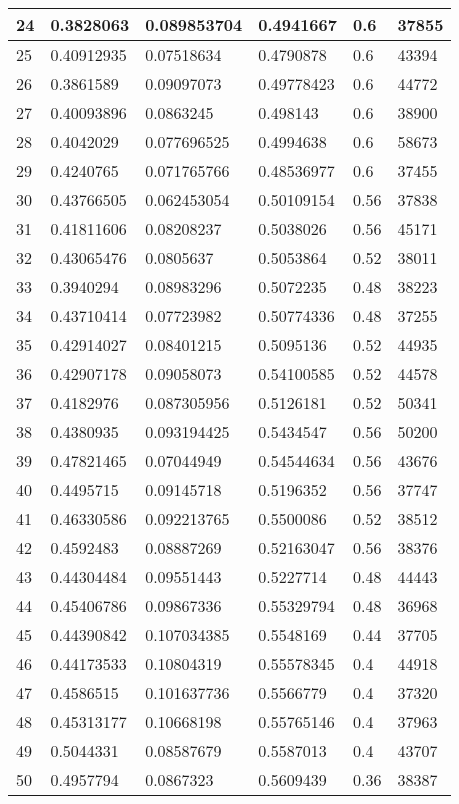\begin{longtable}{|l|l|l|l|l|l|}
24 & 0.3828063 & 0.089853704 & 0.4941667 & 0.6 & 37855 \\ \hline 
25 & 0.40912935 & 0.07518634 & 0.4790878 & 0.6 & 43394 \\ \hline 
26 & 0.3861589 & 0.09097073 & 0.49778423 & 0.6 & 44772 \\ \hline 
27 & 0.40093896 & 0.0863245 & 0.498143 & 0.6 & 38900 \\ \hline 
28 & 0.4042029 & 0.077696525 & 0.4994638 & 0.6 & 58673 \\ \hline 
29 & 0.4240765 & 0.071765766 & 0.48536977 & 0.6 & 37455 \\ \hline 
30 & 0.43766505 & 0.062453054 & 0.50109154 & 0.56 & 37838 \\ \hline 
31 & 0.41811606 & 0.08208237 & 0.5038026 & 0.56 & 45171 \\ \hline 
32 & 0.43065476 & 0.0805637 & 0.5053864 & 0.52 & 38011 \\ \hline 
33 & 0.3940294 & 0.08983296 & 0.5072235 & 0.48 & 38223 \\ \hline 
34 & 0.43710414 & 0.07723982 & 0.50774336 & 0.48 & 37255 \\ \hline 
35 & 0.42914027 & 0.08401215 & 0.5095136 & 0.52 & 44935 \\ \hline 
36 & 0.42907178 & 0.09058073 & 0.54100585 & 0.52 & 44578 \\ \hline 
37 & 0.4182976 & 0.087305956 & 0.5126181 & 0.52 & 50341 \\ \hline 
38 & 0.4380935 & 0.093194425 & 0.5434547 & 0.56 & 50200 \\ \hline 
39 & 0.47821465 & 0.07044949 & 0.54544634 & 0.56 & 43676 \\ \hline 
40 & 0.4495715 & 0.09145718 & 0.5196352 & 0.56 & 37747 \\ \hline 
41 & 0.46330586 & 0.092213765 & 0.5500086 & 0.52 & 38512 \\ \hline 
42 & 0.4592483 & 0.08887269 & 0.52163047 & 0.56 & 38376 \\ \hline 
43 & 0.44304484 & 0.09551443 & 0.5227714 & 0.48 & 44443 \\ \hline 
44 & 0.45406786 & 0.09867336 & 0.55329794 & 0.48 & 36968 \\ \hline 
45 & 0.44390842 & 0.107034385 & 0.5548169 & 0.44 & 37705 \\ \hline 
46 & 0.44173533 & 0.10804319 & 0.55578345 & 0.4 & 44918 \\ \hline 
47 & 0.4586515 & 0.101637736 & 0.5566779 & 0.4 & 37320 \\ \hline 
48 & 0.45313177 & 0.10668198 & 0.55765146 & 0.4 & 37963 \\ \hline 
49 & 0.5044331 & 0.08587679 & 0.5587013 & 0.4 & 43707 \\ \hline 
50 & 0.4957794 & 0.0867323 & 0.5609439 & 0.36 & 38387 \\ \hline 
\end{longtable}
